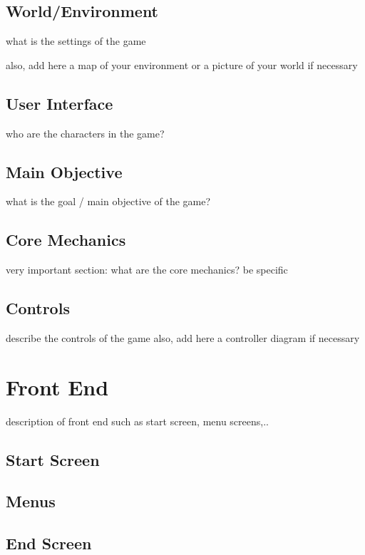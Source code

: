 \documentclass[a4paper]{scrreprt}
\begin{document}
\section{World/Environment}
what is the settings of the game 

also, add here a map of your environment or a picture of your world if necessary

\section{User Interface}
who are the characters in the game?

\section{Main Objective}
what is the goal / main objective of the game?

\section{Core Mechanics}
very important section: what are the core mechanics? be specific

\section{Controls}
describe the controls of the game 
also, add here a controller diagram if necessary 



\chapter{Front End}
description of front end such as start screen, menu screens,..  

\section{Start Screen}

\section{Menus}

\section{End Screen}

\end{document}
